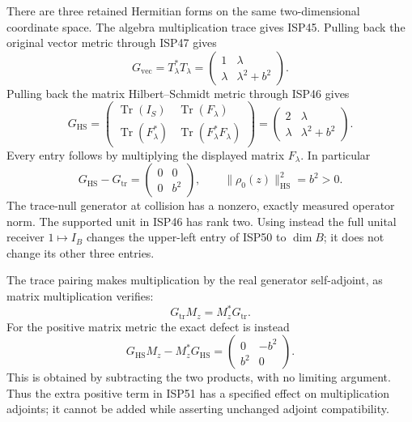 \documentclass[
  10pt,
  a4paper,
]{article}
\begin{document}
There are three retained Hermitian forms on the same two-dimensional
coordinate space. The algebra multiplication trace gives ISP45. Pulling
back the original vector metric through ISP47 gives \[
G_{\mathrm{vec}}=T_\lambda^*T_\lambda
=\begin{pmatrix}1&\lambda\\\lambda&\lambda^2+b^2\end{pmatrix}.
\tag{ISP49}
\] Pulling back the matrix Hilbert--Schmidt metric through ISP46 gives
\[
G_{\mathrm{HS}}=
\begin{pmatrix}
\operatorname{Tr}(I_S)&\operatorname{Tr}(F_\lambda)\\
\operatorname{Tr}(F_\lambda^*)&\operatorname{Tr}(F_\lambda^*F_\lambda)
\end{pmatrix}
=\begin{pmatrix}2&\lambda\\\lambda&\lambda^2+b^2\end{pmatrix}.
\tag{ISP50}
\] Every entry follows by multiplying the displayed matrix
\(F_\lambda\). In particular \[
G_{\mathrm{HS}}-G_{\mathrm{tr}}
=\begin{pmatrix}0&0\\0&b^2\end{pmatrix},
\qquad \|\rho_0(z)\|_{\mathrm{HS}}^2=b^2>0.
\tag{ISP51}
\] The trace-null generator at collision has a nonzero, exactly measured
operator norm. The supported unit in ISP46 has rank two. Using instead
the full unital receiver \(1\mapsto I_B\) changes the upper-left entry
of ISP50 to \(\dim B\); it does not change its other three entries.

The trace pairing makes multiplication by the real generator
self-adjoint, as matrix multiplication verifies: \[
G_{\mathrm{tr}}M_z=M_z^*G_{\mathrm{tr}}.
\] For the positive matrix metric the exact defect is instead \[
G_{\mathrm{HS}}M_z-M_z^*G_{\mathrm{HS}}
=\begin{pmatrix}0&-b^2\\b^2&0\end{pmatrix}.
\tag{ISP52}
\] This is obtained by subtracting the two products, with no limiting
argument. Thus the extra positive term in ISP51 has a specified effect
on multiplication adjoints; it cannot be added while asserting unchanged
adjoint compatibility.
\end{document}
